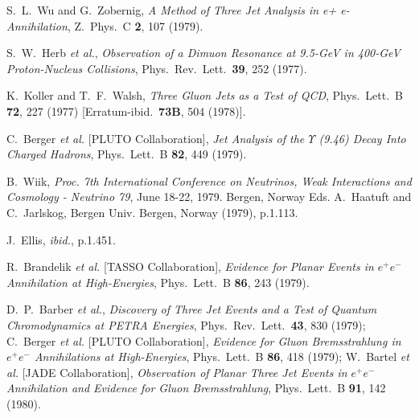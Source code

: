\documentclass[12pt]{article} %
\begin{document}
\begin{thebibliography}{9}
S.~L.~Wu and G.~Zobernig,
{\it A Method of Three Jet Analysis in e+ e- Annihilation},
  Z.\ Phys.\ C {\bf 2}, 107 (1979).

S.~W.~Herb {\it et al.},
{\it Observation of a Dimuon Resonance at 9.5-GeV in 400-GeV Proton-Nucleus Collisions},
  Phys.\ Rev.\ Lett.\  {\bf 39}, 252 (1977).

K.~Koller and T.~F.~Walsh,
{\it Three Gluon Jets as a Test of QCD},
  Phys.\ Lett.\ B {\bf 72}, 227 (1977)
  [Erratum-ibid.\  {\bf 73B}, 504 (1978)].

C.~Berger {\it et al.}  [PLUTO Collaboration],
{\it Jet Analysis of the $\Upsilon$ (9.46) Decay Into Charged Hadrons},
  Phys.\ Lett.\ B {\bf 82}, 449 (1979).

B.~Wiik,
{\it Proc. 7th International Conference on Neutrinos, Weak Interactions and Cosmology - Neutrino 79}, June 18-22, 1979. Bergen, Norway 
Eds. A.~Haatuft and C.~Jarlskog, Bergen Univ. Bergen, Norway (1979), p.1.113.

J.~Ellis, {\it ibid.}, p.1.451.

R.~Brandelik {\it et al.}  [TASSO Collaboration],
{\it Evidence for Planar Events in $e^+ e^-$ Annihilation at High-Energies},
  Phys.\ Lett.\ B {\bf 86}, 243 (1979).

D.~P.~Barber {\it et al.},
{\it Discovery of Three Jet Events and a Test of Quantum Chromodynamics at PETRA Energies},
  Phys.\ Rev.\ Lett.\  {\bf 43}, 830 (1979);
C.~Berger {\it et al.}  [PLUTO Collaboration],
{\it Evidence for Gluon Bremsstrahlung in $e^+ e^-$ Annihilations at High-Energies},
  Phys.\ Lett.\ B {\bf 86}, 418 (1979);
  W.~Bartel {\it et al.}  [JADE Collaboration],
{\it Observation of Planar Three Jet Events in $e^+ e^-$ Annihilation and Evidence for Gluon Bremsstrahlung},
  Phys.\ Lett.\ B {\bf 91}, 142 (1980).
  

\end{thebibliography}
\end{document}
